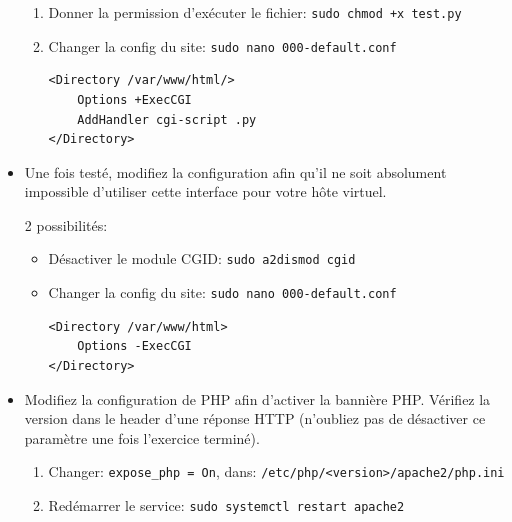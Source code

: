 \documentclass[a4paper]{article}
\begin{document}
\begin{itemize}
\begin{example}
\begin{enumerate}
\item Donner la permission d'exécuter le fichier: \texttt{sudo chmod +x test.py} 

\item Changer la config du site: \texttt{sudo nano 000-default.conf}
\begin{example} \begin{verbatim}
<Directory /var/www/html/>
    Options +ExecCGI
    AddHandler cgi-script .py
</Directory>
\end{verbatim} \end{example}

\end{enumerate} \end{example}


\item Une fois testé, modifiez la configuration afin qu’il ne soit absolument impossible d’utiliser cette interface pour votre hôte virtuel.
\begin{example}
2 possibilités:
\begin{itemize}

\item Désactiver le module CGID: \texttt{sudo a2dismod cgid}

\item Changer la config du site: \texttt{sudo nano 000-default.conf}
\begin{example} \begin{verbatim}
<Directory /var/www/html>
    Options -ExecCGI
</Directory>
\end{verbatim} \end{example}

\end{itemize}

\end{example}


\item Modifiez la configuration de PHP afin d’activer la bannière PHP. Vérifiez la version dans le header d’une réponse HTTP (n’oubliez pas de désactiver ce paramètre une fois l’exercice terminé).
\begin{example} \begin{enumerate}
    \item Changer: \texttt{expose\_php = On}, dans: \texttt{/etc/php/<version>/apache2/php.ini}
    \item Redémarrer le service: \texttt{sudo systemctl restart apache2}
\end{enumerate} \end{example}



\end{itemize}
\end{document}
